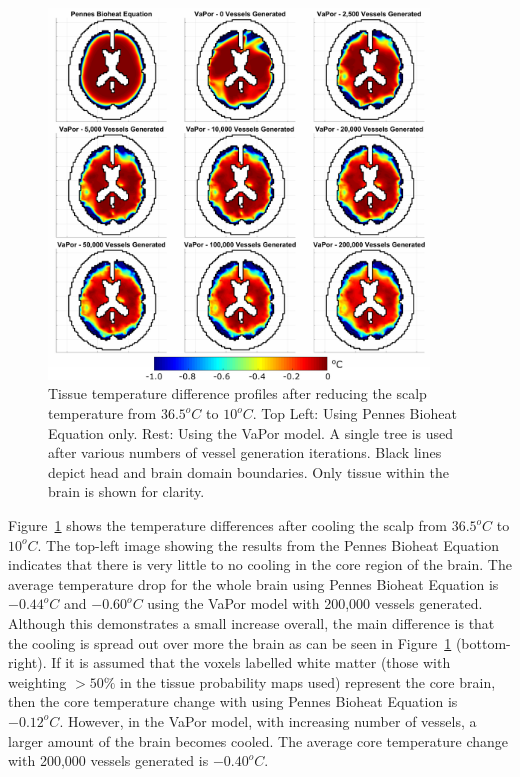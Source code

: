 \documentclass[11pt,english,a4paper,twoside,openright]{report}
\begin{document}
{{{{{{{{\begin{figure}[t]
	\centering
	\includegraphics[width=0.9\textwidth]{Chapter3/TissueDifferences}
	\caption[Tissue temperature difference profiles after reducing the scalp temperature from $36.5^{o}C$ to $10^{o}C$ using Pennes Bioheat Equation and the VaPor model at various levels of vessel generation]{Tissue temperature difference profiles after reducing the scalp temperature from $36.5^{o}C$ to $10^{o}C$. Top Left: Using Pennes Bioheat Equation only. Rest: Using the VaPor model. A single tree is used after various numbers of vessel generation iterations. Black lines depict head and brain domain boundaries. Only tissue within the brain is shown for clarity.}
	\label{fig:TissueDifferences}
\end{figure}

Figure~\ref{fig:TissueDifferences} shows the temperature differences after cooling the scalp from $36.5^{o}C$ to $10^{o}C$. The top-left image showing the results from the Pennes Bioheat Equation indicates that there is very little to no cooling in the core region of the brain. The average temperature drop for the whole brain using Pennes Bioheat Equation is $-0.44^{o}C$ and $-0.60^{o}C$ using the VaPor model with 200,000 vessels generated. Although this demonstrates a small increase overall, the main difference is that the cooling is spread out over more the brain as can be seen in Figure~\ref{fig:TissueDifferences} (bottom-right). If it is assumed that the voxels labelled white matter (those with weighting {$>$}$50\%$ in the tissue probability maps used) represent the core brain, then the core temperature change with using Pennes Bioheat Equation is $-0.12^{o}C$. However, in the VaPor model, with increasing number of vessels, a larger amount of the brain becomes cooled. The average core temperature change with 200,000 vessels generated is $-0.40^{o}C$. 

}}}}}}}}
\end{document}
